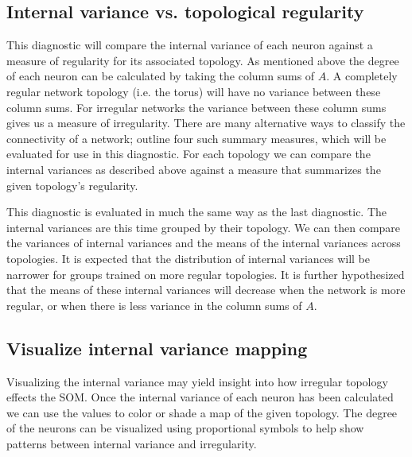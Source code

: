 \subsection{Internal variance vs. topological regularity}
This diagnostic will compare the internal variance of each neuron against a
measure of regularity for its associated topology.  As mentioned above the
degree of each neuron can be calculated by taking the column sums of $A$.  A
completely regular network topology (i.e. the torus) will have no variance
between these column sums.  For irregular networks the variance between these
column sums gives us a measure of irregularity. There are many alternative
ways to classify the connectivity of a network; \cite{florax95} outline four
such summary measures, which will be evaluated for use in this diagnostic.
For each topology we can compare the internal variances as described above
against a measure that summarizes the given topology's regularity.

This diagnostic is evaluated in much the same way as the last diagnostic.  
The internal variances are this time grouped by their topology.  We can then
compare the variances of internal variances and the means of the internal
variances across topologies.  It is expected that the distribution of internal
variances will be narrower for groups trained on more regular topologies.
It is further hypothesized that the means of these internal variances will
decrease when the network is more regular, or when there is less variance in
the column sums of $A$.  

\subsection{Visualize internal variance mapping}
Visualizing the internal variance may yield insight into how irregular topology
effects the SOM.  Once the internal variance of each neuron has been calculated
we can use the values to color or shade a map of the given topology.  The degree
of the neurons can be visualized using proportional symbols to help show
patterns between internal variance and irregularity.

